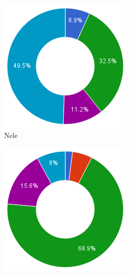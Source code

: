 \documentclass[eind]{penoverslag}
\begin{document}
\begin{figure}[h]
        \centering
        \begin{subfigure}[hb]{0.15\textwidth}
                \centering
                \includegraphics[width=\textwidth]{werk_Nele}
                \caption{Nele}
        \end{subfigure}%
        \begin{subfigure}[hb]{0.15\textwidth}
                \centering
                \includegraphics[width=\textwidth]{werk_Toon}

\end{subfigure}
\end{figure}
\end{document}
